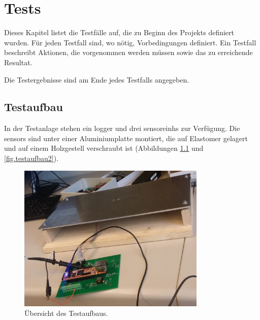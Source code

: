 %
%


\chapter{Tests}\label{chap.tests}

Dieses Kapitel listet die Testfälle auf, die zu Beginn des Projekts definiert wurden. Für jeden Testfall sind, wo nötig, Vorbedingungen definiert. Ein Testfall beschreibt Aktionen, die vorgenommen werden müssen sowie das zu erreichende Resultat.

Die Testergebnisse sind am Ende jedes Testfalls angegeben.

\section{Testaufbau}
In der Testanlage stehen ein \gls{logger} und drei \glspl{sensoreinh} zur Verfügung. Die \glspl{sensor} sind unter einer Aluminiumplatte montiert, die auf Elastomer gelagert und auf einem Holzgestell verschraubt ist (Abbildungen \ref{fig.testaufbau1} und \ref{fig.testaufbau2}).

\begin{figure}
	\centering
		\includegraphics[width=0.8\textwidth]{images/fotos/testaufbau1.jpg}
	\caption{Übersicht des Testaufbaus.}
	\label{fig.testaufbau1}
\end{figure}

